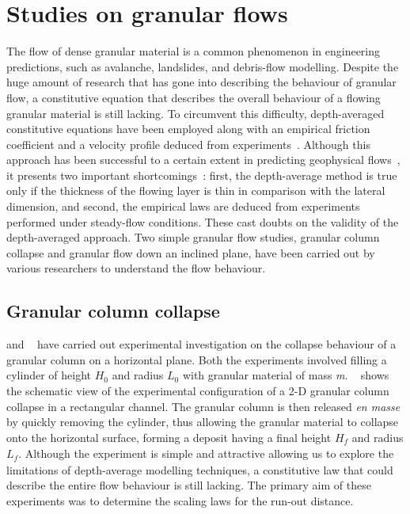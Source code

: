 \section{Studies on granular flows}
The flow of dense granular material is a common phenomenon in engineering 
predictions, such as avalanche, landslides, and debris-flow modelling. Despite 
the huge amount of research that has gone into describing the behaviour of 
granular flow, a constitutive equation that describes the overall behaviour of 
a flowing granular material is still lacking. To circumvent this difficulty, 
depth-averaged constitutive equations have been employed along with an 
empirical friction coefficient and a velocity profile deduced from 
experiments~\citep{Midi2004,Iverson2003,Pouliquen1999}. Although this approach 
has been successful to a certain extent in predicting geophysical 
flows~\citep{Pouliquen2002a, Hutter1995}, it presents two important 
shortcomings~\citep{Lajeunesse2005}: first, the depth-average method is true 
only if the thickness of the flowing layer is thin in comparison with the 
lateral dimension, and second, the empirical laws are deduced from experiments 
performed under steady-flow conditions. These cast doubts on the validity of 
the depth-averaged approach. Two simple granular flow studies, granular column 
collapse and granular flow down an inclined plane, have been carried out by 
various researchers to understand the flow behaviour.

\subsection{Granular column collapse}
\citet{Lube2005} and ~\citet{Lajeunesse2004} have carried out experimental 
investigation on the collapse behaviour of a granular column on a horizontal 
plane. Both the experiments involved filling a cylinder of height 
$\textit{H}_{\textit{0}}$ and radius $\textit{L}_{\textit{0}}$ with granular 
material of mass \textit{m}. ~ 
shows the schematic view of the experimental configuration of a 2-D granular 
column collapse in a rectangular channel. The granular column is then released 
\textit{en masse} by quickly removing the cylinder, thus allowing the granular 
material to collapse onto the horizontal surface, forming a deposit having a 
final height 
$\textit{H}_{\textit{f}}$ and radius $\textit{L}_{\textit{f}}$. Although the 
experiment is simple and attractive allowing us to explore the limitations of 
depth-average modelling techniques, a constitutive law that could describe the 
entire flow behaviour is still lacking. The primary aim of these experiments 
was to determine the scaling laws for the run-out distance.


